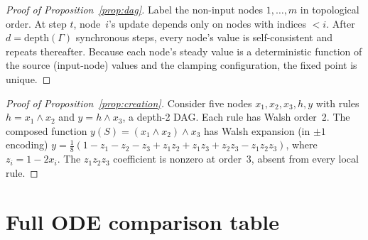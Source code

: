 \documentclass[10pt]{article}
\begin{document}
\begin{proof}[Proof of Proposition~\ref{prop:dag}]
Label the non-input nodes $1, \ldots, m$ in topological order. At
step $t$, node~$i$'s update depends only on nodes with indices
$< i$. After $d = \mathrm{depth}(\Gamma)$ synchronous steps, every
node's value is self-consistent and repeats thereafter. Because
each node's steady value is a deterministic function of the source
(input-node) values and the clamping configuration, the fixed point
is unique.
\end{proof}

\begin{proof}[Proof of Proposition~\ref{prop:creation}]
Consider five nodes $x_1, x_2, x_3, h, y$ with rules
$h = x_1 \wedge x_2$ and $y = h \wedge x_3$, a depth-2 DAG. Each
rule has Walsh order~2. The composed function
$y(S) = (x_1 \wedge x_2) \wedge x_3$ has Walsh expansion (in
$\pm 1$ encoding)
$y = \tfrac{1}{8}(1 - z_1 - z_2 - z_3 + z_1 z_2 + z_1 z_3
+ z_2 z_3 - z_1 z_2 z_3)$,
where $z_i = 1 - 2x_i$. The $z_1 z_2 z_3$ coefficient is nonzero
at order~3, absent from every local rule.
\end{proof}


\section{Full ODE comparison table}
\label{supp:ode-table}
\end{document}
